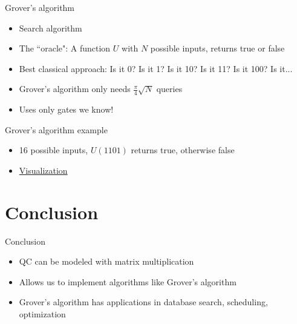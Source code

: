 \documentclass[14pt]{beamer}
\begin{document}

\begin{frame}{Grover's algorithm}
\begin{itemize}
	\item Search algorithm
	\item The ``oracle": A function $U$ with $N$ possible inputs, returns true or false
	\item Best classical approach: Is it 0? Is it 1? Is it 10? Is it 11? Is it 100? Is it...
	\item Grover's algorithm only needs $\frac{\pi}{4}\sqrt{N}$ queries
	\item Uses only gates we know!
\end{itemize}
\end{frame}

\begin{frame}{Grover's algorithm example}
\begin{itemize}
	\item 16 possible inputs, $U(1101)$ returns true, otherwise false
	\item \href{http://algorithmicassertions.com/quirk\#circuit={"cols":[["X","X","X","X"],["H","H","H","H"],["Chance4"],["Sample4"],["Z","\%E2\%80\%A2","\%E2\%97\%A6","\%E2\%80\%A2"],["H","H","H","H"],["Z","\%E2\%80\%A2","\%E2\%80\%A2","\%E2\%80\%A2"],["H","H","H","H"],["Chance4"],["Sample4"],["Z","\%E2\%80\%A2","\%E2\%97\%A6","\%E2\%80\%A2"],["H","H","H","H"],["Z","\%E2\%80\%A2","\%E2\%80\%A2","\%E2\%80\%A2"],["H","H","H","H"],["Chance4"],["Sample4"],["Z","\%E2\%80\%A2","\%E2\%97\%A6","\%E2\%80\%A2"],["H","H","H","H"],["Z","\%E2\%80\%A2","\%E2\%80\%A2","\%E2\%80\%A2"],["H","H","H","H"],["Chance4"],["Sample4"]]}}{Visualization}
\end{itemize}
\end{frame}

\section{Conclusion}
\begin{frame}{Conclusion}
\begin{itemize}
	\item QC can be modeled with matrix multiplication
	\item Allows us to implement algorithms like Grover's algorithm
	\item Grover's algorithm has applications in database search, scheduling, optimization
\end{itemize}
\end{frame}
\end{document}
